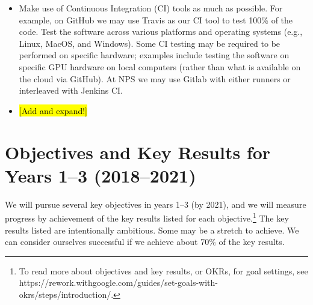 \documentclass{article}
\begin{document}
\begin{itemize}
    \item Make use of Continuous Integration (CI) tools as much as possible.  For example, on GitHub we may use Travis as our CI tool to test 100\% of the code. Test the software across various platforms and operating systems (e.g., Linux, MacOS, and Windows).  Some CI testing may be required to be performed on specific hardware; examples include testing the software on specific GPU hardware on local computers (rather than what is available on the cloud via GitHub).  At NPS we may use Gitlab with either runners or interleaved with Jenkins CI.
    \item \hl{[Add and expand!]}
\end{itemize}

\section{Objectives and Key Results for Years 1--3 (2018--2021)}

We will pursue several key objectives in years 1--3 (by 2021), and we will measure progress by achievement of the key results listed for each objective.\footnote{To read more about objectives and key results, or OKRs, for goal settings, see https://rework.withgoogle.com/guides/set-goals-with-okrs/steps/introduction/.} The key results listed are intentionally ambitious. Some may be a stretch to achieve. We can consider ourselves successful if we achieve about 70\% of the key results. 
 
\end{document}
